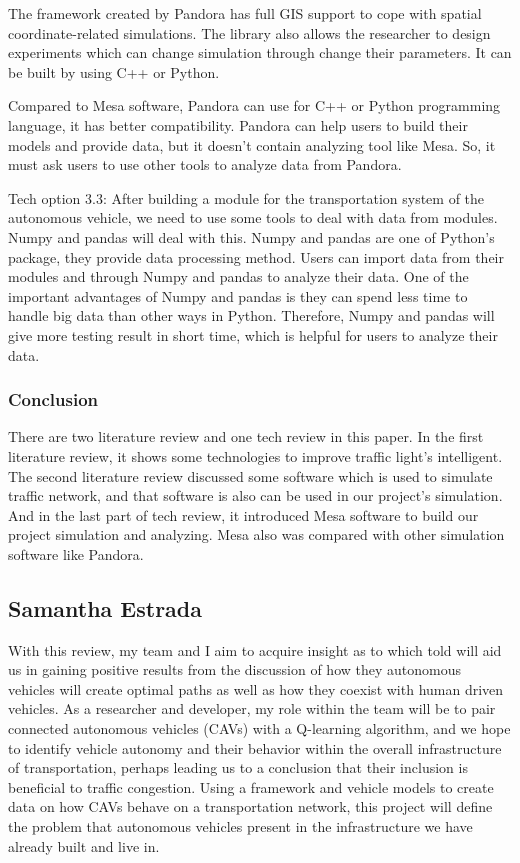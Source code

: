 \documentclass[onecolumn, draftclsnofoot,10pt, compsoc]{IEEEtran}
\begin{document}
The framework created by Pandora has full GIS support to cope with spatial coordinate-related simulations.
The library also allows the researcher to design experiments which can change simulation through change their parameters.
It can be built by using C++ or Python.

Compared to Mesa software, Pandora can use for C++ or Python programming language, it has better compatibility.
Pandora can help users to build their models and provide data, but it doesn’t contain analyzing tool like Mesa.
So, it must ask users to use other tools to analyze data from Pandora.

Tech option 3.3: After building a module for the transportation system of the autonomous vehicle, we need to use some tools to deal with data from modules.
Numpy and pandas will deal with this.
Numpy and pandas are one of Python's package, they provide data processing method.
Users can import data from their modules and through Numpy and pandas to analyze their data.
One of the important advantages of Numpy and pandas is they can spend less time to handle big data than other ways in Python.
Therefore, Numpy and pandas will give more testing result in short time, which is helpful for users to analyze their data.
\subsubsection{Conclusion}
There are two literature review and one tech review in this paper.
In the first literature review, it shows some technologies to improve traffic light's intelligent.
The second literature review discussed some software which is used to simulate traffic network, and that software is also can be used in our project's simulation.
And in the last part of tech review, it introduced Mesa software to build our project simulation and analyzing.
Mesa also was compared with other simulation software like Pandora.
\subsection{Samantha Estrada}
With this review, my team and I aim to acquire insight as to which told will aid us in gaining positive results from the discussion of how they autonomous vehicles will create optimal paths as well as how they coexist with human driven vehicles.
As a researcher and developer, my role within the team will be to pair connected autonomous vehicles (CAVs) with a Q-learning algorithm, and we hope to identify vehicle autonomy and their behavior within the overall infrastructure of transportation, perhaps leading us to a conclusion that their inclusion is beneficial to traffic congestion.
Using a framework and vehicle models to create data on how CAVs behave on a transportation network, this project will define the problem that autonomous vehicles present in the infrastructure we have already built and live in.
\end{document}
